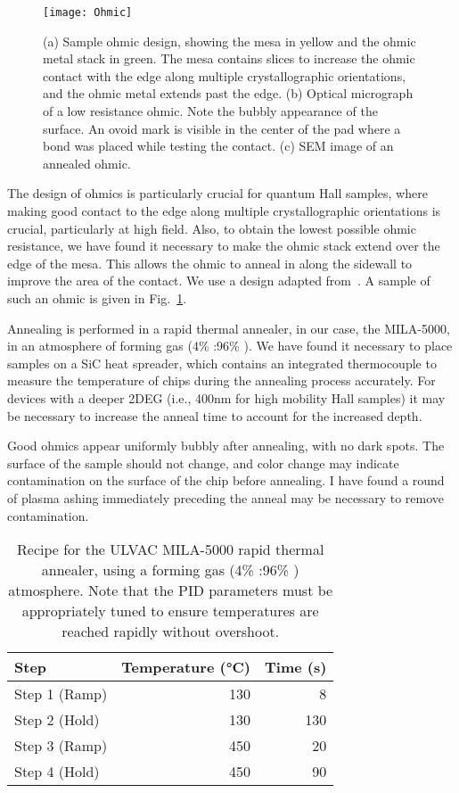 \begin{figure}
    \texttt{[image: Ohmic]}
    \caption[Sample ohmic design and anneal]
    {\label{fig:ohmic}(a) Sample ohmic design, showing the mesa in yellow and the ohmic metal stack in green. The mesa contains slices to increase the ohmic contact with the edge along multiple crystallographic orientations, and the ohmic metal extends past the edge. (b) Optical micrograph of a low resistance ohmic. Note the bubbly appearance of the surface. An ovoid mark is visible in the center of the pad where a bond was placed while testing the contact. (c) SEM image of an annealed ohmic.}
\end{figure}

The design of ohmics is particularly crucial for quantum Hall samples, where making good contact to the edge along multiple
crystallographic orientations is crucial, particularly at high field. Also, to obtain the lowest possible ohmic resistance,
we have found it necessary to make the ohmic stack extend over the edge of the mesa. This allows the ohmic to anneal in along the
sidewall to improve the area of the contact. We use a design adapted from~\cite{2007PhDTM}. A sample of such an ohmic is given in Fig.~\ref{fig:ohmic}.

Annealing is performed in a rapid thermal annealer, in our case, the MILA-5000, in an atmosphere of forming gas (4\% :96\% ).
We have found it necessary to place samples on a SiC heat spreader, which contains an integrated thermocouple to measure the temperature of
chips during the annealing process accurately. For devices with a deeper 2DEG (i.e., 400nm for high mobility Hall samples)
it may be necessary to increase the anneal time to account for the increased depth.

Good ohmics appear uniformly bubbly after annealing, with no dark spots. The surface of the sample should not change, and color change
may indicate contamination on the surface of the chip before annealing. I have found a round of plasma ashing immediately preceding the
anneal may be necessary to remove contamination.

\begin{table}
    \centering
    \begin{tabular}{lrr}
        \toprule
        Step & Temperature (\si{\celsius}) & Time (\si{\second}) \\
        \midrule
        Step 1 (Ramp) & 130 & 8 \\
        Step 2 (Hold) & 130 & 130 \\
        Step 3 (Ramp) & 450 & 20 \\
        Step 4 (Hold) & 450 & 90 \\
        \bottomrule
    \end{tabular}
    \caption[Rapid thermal anneal recipe]
    {Recipe for the ULVAC MILA-5000 rapid thermal annealer, using a forming gas (4\% :96\% ) atmosphere. Note that the PID parameters must be appropriately tuned
    to ensure temperatures are reached rapidly without overshoot.}
    \label{tab:anneal}
\end{table}

